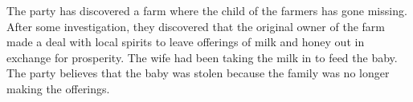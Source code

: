 The party has discovered a farm where the child of the farmers has gone missing.
After some investigation, they discovered that the original owner of the farm made a deal with local spirits to leave offerings of milk and honey out in exchange for prosperity.
The wife had been taking the milk in to feed the baby.
The party believes that the baby was stolen because the family was no longer making the offerings.
